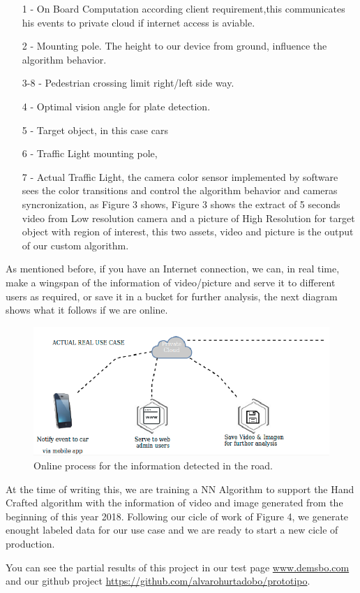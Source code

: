 \begin{itemize}[noitemsep] %

\item[1]- On Board Computation according client requirement,this communicates his events to private cloud if internet access is aviable.
\item[2]- Mounting pole. The height to our device from ground, influence the algorithm behavior. 
\item[3-8]- Pedestrian crossing limit right/left side way.
\item[4]- Optimal vision angle for plate detection.
\item[5]- Target object, in this case cars
\item[6]- Traffic Light mounting pole,
\item[7]- Actual Traffic Light, the camera color sensor implemented by software sees the color transitions and control the algorithm behavior and cameras syncronization, as Figure 3 shows, Figure 3 shows the extract of 5 seconds video from Low resolution camera and a picture of High Resolution for target object with region of interest, this two assets, video and picture is the output of our custom algorithm.
\end{itemize}

As mentioned before, if you have an Internet connection, we can, in real time, make a wingspan of the information of video/picture and serve it to different users as required, or save it in a bucket for further analysis, the next diagram shows what it follows if we are online.


\begin{figure}[H]\centering
	\includegraphics[width=\linewidth]{images/online}
	\caption{Online process for the information detected in the road. }
	\label{fig:work_dec}
\end{figure}

At the time of writing this, we are training a NN Algorithm to support the Hand Crafted algorithm  with the information of video and image generated from the beginning of this year 2018. Following our cicle of work of Figure 4, we generate enought labeled data for our use case and we are ready to start a new cicle of production.

You can see the partial results of this project in our test page \href{www.demsbo.com}{www.demsbo.com} and our github project \href{https://github.com/alvarohurtadobo/prototipo}{https://github.com/alvarohurtadobo/prototipo}.

